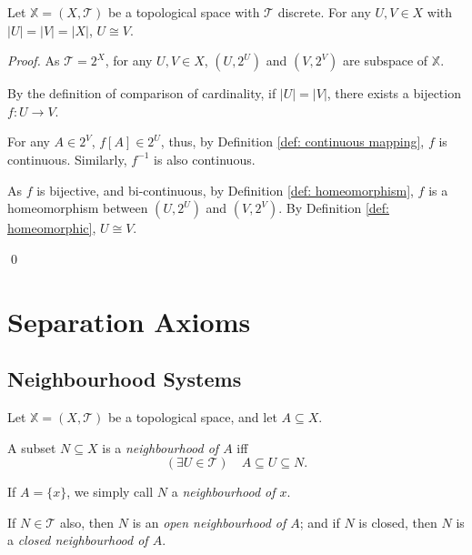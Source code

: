 \begin{example}
	Let $\mathbb X = (X, \mathcal T)$ be a topological space with $\mathcal T$ discrete. For any $U,V \in X$ with $|U| = |V| = |X|$, $U \cong V$.
	
	\begin{proof}
		As $\mathcal T = 2^X$, for any $U, V \in X$, $(U, 2^U )$ and $( V, 2^V )$ are subspace of $\mathbb X$.
		
		By the definition of comparison of cardinality, if $|U| = |V|$, there exists a bijection $f: U \to V$.
		
		For any $A \in 2^V$, $f[A] \in 2^U$, thus, by Definition \ref{def: continuous mapping}, $f$ is continuous. Similarly, $f^{-1}$ is also continuous.
		
		As $f$ is bijective, and bi-continuous, by Definition \ref{def: homeomorphism}, $f$ is a homeomorphism between $(U, 2^U)$ and $(V, 2^V)$. By Definition \ref{def: homeomorphic}, $U \cong V$.
		
		\qed
	\end{proof}
\end{example}


\chapter{Separation Axioms}


\section{Neighbourhood Systems}


\begin{definition}
	\label{def: neighbourhood}
	Let $\mathbb X = (X, \mathcal T)$ be a topological space, and let $A \subseteq X$.
	
	A subset $N \subseteq X$ is a \textit{neighbourhood of $A$} iff
	$$
	(\exists U \in \mathcal T) \quad A \subseteq U \subseteq N.
	$$
	
	If $A = \{x\}$, we simply call $N$ a \textit{neighbourhood of $x$}.
	
	If $N \in \mathcal T$ also, then $N$ is an \textit{open neighbourhood of $A$}; and if $N$ is closed, then $N$ is a \textit{closed neighbourhood of $A$}.
\end{definition}


